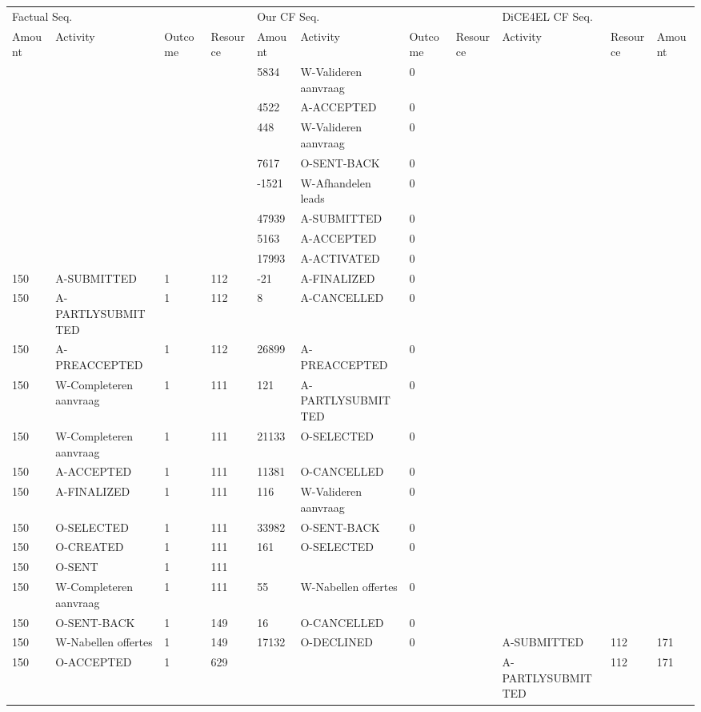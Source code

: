 \begin{tabular}{lllllllllll}
\toprule
\multicolumn{4}{l}{Factual Seq.} & \multicolumn{4}{l}{Our CF Seq.} & \multicolumn{3}{l}{DiCE4EL CF Seq.} \\
Amount & Activity & Outcome & Resource & Amount & Activity & Outcome & Resource & Activity & Resource & Amount \\
\midrule
 &  &  &  & 5834 & W-Valideren aanvraag & 0 &  &  &  &  \\
 &  &  &  & 4522 & A-ACCEPTED & 0 &  &  &  &  \\
 &  &  &  & 448 & W-Valideren aanvraag & 0 &  &  &  &  \\
 &  &  &  & 7617 & O-SENT-BACK & 0 &  &  &  &  \\
 &  &  &  & -1521 & W-Afhandelen leads & 0 &  &  &  &  \\
 &  &  &  & 47939 & A-SUBMITTED & 0 &  &  &  &  \\
 &  &  &  & 5163 & A-ACCEPTED & 0 &  &  &  &  \\
 &  &  &  & 17993 & A-ACTIVATED & 0 &  &  &  &  \\
150 & A-SUBMITTED & 1 & 112 & -21 & A-FINALIZED & 0 &  &  &  &  \\
150 & A-PARTLYSUBMITTED & 1 & 112 & 8 & A-CANCELLED & 0 &  &  &  &  \\
150 & A-PREACCEPTED & 1 & 112 & 26899 & A-PREACCEPTED & 0 &  &  &  &  \\
150 & W-Completeren aanvraag & 1 & 111 & 121 & A-PARTLYSUBMITTED & 0 &  &  &  &  \\
150 & W-Completeren aanvraag & 1 & 111 & 21133 & O-SELECTED & 0 &  &  &  &  \\
150 & A-ACCEPTED & 1 & 111 & 11381 & O-CANCELLED & 0 &  &  &  &  \\
150 & A-FINALIZED & 1 & 111 & 116 & W-Valideren aanvraag & 0 &  &  &  &  \\
150 & O-SELECTED & 1 & 111 & 33982 & O-SENT-BACK & 0 &  &  &  &  \\
150 & O-CREATED & 1 & 111 & 161 & O-SELECTED & 0 &  &  &  &  \\
150 & O-SENT & 1 & 111 &  &  &  &  &  &  &  \\
150 & W-Completeren aanvraag & 1 & 111 & 55 & W-Nabellen offertes & 0 &  &  &  &  \\
150 & O-SENT-BACK & 1 & 149 & 16 & O-CANCELLED & 0 &  &  &  &  \\
150 & W-Nabellen offertes & 1 & 149 & 17132 & O-DECLINED & 0 &  & A-SUBMITTED & 112 & 171 \\
150 & O-ACCEPTED & 1 & 629 &  &  &  &  & A-PARTLYSUBMITTED & 112 & 171 \\

\end{tabular}
